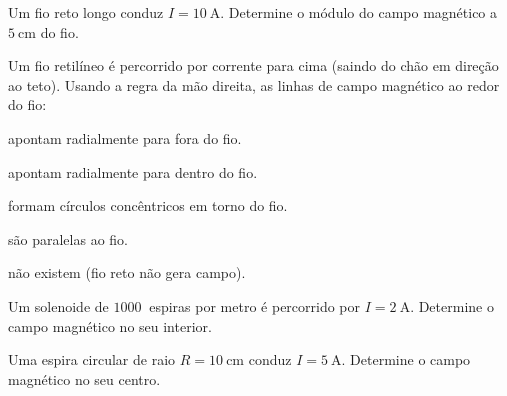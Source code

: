 \begin{questao}[1]{}
Um fio reto longo conduz $I = \SI{10}{\ampere}$. Determine o módulo do campo
magnético a $\SI{5}{\centi\meter}$ do fio.
\end{questao}

\begin{questao}[1]{}
Um fio retilíneo é percorrido por corrente para cima (saindo do chão em direção ao
teto). Usando a regra da mão direita, as linhas de campo magnético ao redor do fio:
\begin{alternativas}
\item apontam radialmente para fora do fio.
\item apontam radialmente para dentro do fio.
\item formam círculos concêntricos em torno do fio.
\item são paralelas ao fio.
\item não existem (fio reto não gera campo).
\end{alternativas}
\end{questao}

\blocoaplicacao

\begin{questao}[2]{}
Um solenoide de $\SI{1000}{}$ espiras por metro é percorrido por
$I = \SI{2}{\ampere}$. Determine o campo magnético no seu interior.
\end{questao}

\begin{questao}[2]{}
Uma espira circular de raio $R = \SI{10}{\centi\meter}$ conduz
$I = \SI{5}{\ampere}$. Determine o campo magnético no seu centro.
\end{questao}


